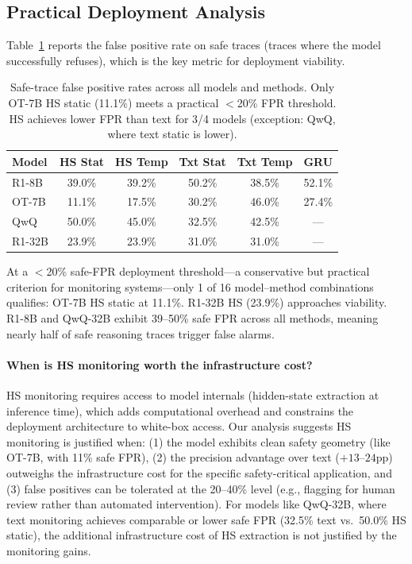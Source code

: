 \documentclass[11pt,a4paper]{article}
\newcommand{\pp}{\text{pp}}
\begin{document}
\subsection{Practical Deployment Analysis}
\label{sec:deployment}

Table~\ref{tab:safe-fpr} reports the false positive rate on safe traces (traces where the model successfully refuses), which is the key metric for deployment viability.

\begin{table}[t]
\centering
\small
\begin{tabular}{lccccc}
\toprule
\textbf{Model} & \textbf{HS Stat} & \textbf{HS Temp} & \textbf{Txt Stat} & \textbf{Txt Temp} & \textbf{GRU} \\
\midrule
R1-8B & 39.0\% & 39.2\% & 50.2\% & 38.5\% & 52.1\% \\
OT-7B & 11.1\% & 17.5\% & 30.2\% & 46.0\% & 27.4\% \\
QwQ & 50.0\% & 45.0\% & 32.5\% & 42.5\% & --- \\
R1-32B & 23.9\% & 23.9\% & 31.0\% & 31.0\% & --- \\
\bottomrule
\end{tabular}
\caption{Safe-trace false positive rates across all models and methods. Only OT-7B HS static (11.1\%) meets a practical $<$20\% FPR threshold. HS achieves lower FPR than text for 3/4 models (exception: QwQ, where text static is lower).}
\label{tab:safe-fpr}
\end{table}

At a $<$20\% safe-FPR deployment threshold---a conservative but practical criterion for monitoring systems---only 1 of 16 model--method combinations qualifies: OT-7B HS static at 11.1\%.
R1-32B HS (23.9\%) approaches viability.
R1-8B and QwQ-32B exhibit 39--50\% safe FPR across all methods, meaning nearly half of safe reasoning traces trigger false alarms.

\paragraph{When is HS monitoring worth the infrastructure cost?}
HS monitoring requires access to model internals (hidden-state extraction at inference time), which adds computational overhead and constrains the deployment architecture to white-box access.
Our analysis suggests HS monitoring is justified when: (1) the model exhibits clean safety geometry (like OT-7B, with 11\% safe FPR), (2) the precision advantage over text ($+13$--$24\pp$) outweighs the infrastructure cost for the specific safety-critical application, and (3) false positives can be tolerated at the 20--40\% level (e.g., flagging for human review rather than automated intervention).
For models like QwQ-32B, where text monitoring achieves comparable or lower safe FPR (32.5\% text vs.\ 50.0\% HS static), the additional infrastructure cost of HS extraction is not justified by the monitoring gains.
\end{document}
